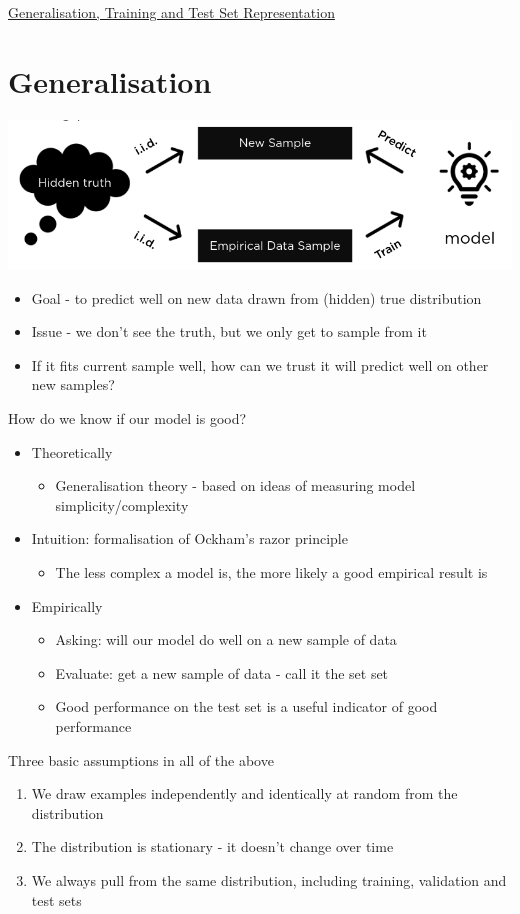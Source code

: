 \documentclass{article}[18pt]
\begin{document}
\begin{center}
\underline{\huge Generalisation, Training and Test Set Representation}
\end{center}
\section{Generalisation}
\begin{center}
	\includegraphics[scale=0.7]{Generalisation}
\end{center}
\begin{itemize}
	\item Goal - to predict well on new data drawn from (hidden) true distribution
	\item Issue - we don't see the truth, but we only get to sample from it
	\item If it fits current sample well, how can we trust it will predict well on other new samples?
\end{itemize}
How do we know if our model is good?
\begin{itemize}
	\item Theoretically
	\begin{itemize}
		\item Generalisation theory - based on ideas of measuring model simplicity/complexity
	\end{itemize}
	\item Intuition: formalisation of Ockham's razor principle
	\begin{itemize}
		\item The less complex a model is, the more likely a good empirical result is
	\end{itemize}
	\item Empirically
	\begin{itemize}
		\item Asking: will our model do well on a new sample of data 
		\item Evaluate: get a new sample of data - call it the set set
		\item Good performance on the test set is a useful indicator of good performance
	\end{itemize}
\end{itemize}
Three basic assumptions in all of the above
\begin{enumerate}
	\item We draw examples independently and identically at random from the distribution
	\item The distribution is stationary - it doesn't change over time
	\item We always pull from the same distribution, including training, validation and test sets
\end{enumerate}
\end{document}
